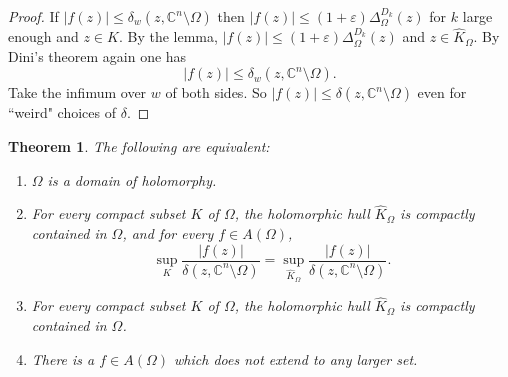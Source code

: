 \documentclass[12pt]{report}
\newcommand{\CC}{\mathbb{C}}
\newtheorem{theorem}{Theorem}[chapter]
\theoremstyle{definition}
\begin{document}
\begin{proof}
    If $|f(z)| \leq \delta_w(z, \CC^n \setminus \Omega)$ then $|f(z)| \leq (1 + \varepsilon) \Delta^{D_k}_\Omega(z)$ for $k$ large enough and $z \in K$. By the lemma, $|f(z)| \leq (1 + \varepsilon)\Delta_\Omega^{D_k}(z)$ and $z \in \hat K_\Omega$. By Dini's theorem again one has
    $$|f(z)| \leq \delta_w(z, \CC^n \setminus \Omega).$$
    Take the infimum over $w$ of both sides. So $|f(z)| \leq \delta(z, \CC^n \setminus \Omega)$ even for ``weird" choices of $\delta$. 
\end{proof}


\begin{theorem}
The following are equivalent:
\begin{enumerate}
    \item $\Omega$ is a domain of holomorphy.
    \item For every compact subset $K$ of $\Omega$, the holomorphic hull $\hat K_\Omega$ is compactly contained in $\Omega$, and for every $f \in A(\Omega)$,
    $$\sup_K \frac{|f(z)|}{\delta(z, \CC^n \setminus \Omega)} = \sup_{\hat K_\Omega} \frac{|f(z)|}{\delta(z, \CC^n \setminus \Omega)}.$$
    \item For every compact subset $K$ of $\Omega$, the holomorphic hull $\hat K_\Omega$ is compactly contained in $\Omega$.
    \item There is a $f \in A(\Omega)$ which does not extend to any larger set.
\end{enumerate}
\end{theorem}
\end{document}
